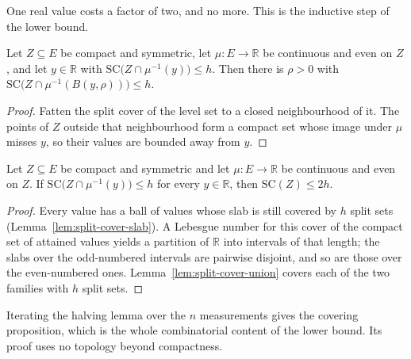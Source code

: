 One real value costs a factor of two, and no more. This is the inductive step of the
lower bound.

\begin{lemma}
\label{lem:split-cover-slab}
\leanok
{}
Let $Z \subseteq E$ be compact and symmetric, let $\mu : E \to \mathbb{R}$ be
continuous and even on $Z$, and let $y \in \mathbb{R}$ with
$\mathrm{SC}\bigl( Z \cap \mu^{-1}(y) \bigr) \le h$. Then there is $\rho > 0$ with
$\mathrm{SC}\bigl( Z \cap \mu^{-1}(B(y, \rho)) \bigr) \le h$.
\end{lemma}
\begin{proof}
\leanok
{}
Fatten the split cover of the level set to a closed neighbourhood of it. The points of
$Z$ outside that neighbourhood form a compact set whose image under $\mu$ misses $y$,
so their values are bounded away from $y$.
\end{proof}

\begin{theorem}
\label{thm:halving}
\leanok
{}
Let $Z \subseteq E$ be compact and symmetric and let $\mu : E \to \mathbb{R}$ be
continuous and even on $Z$. If $\mathrm{SC}\bigl( Z \cap \mu^{-1}(y) \bigr) \le h$ for
every $y \in \mathbb{R}$, then $\mathrm{SC}(Z) \le 2h$.
\end{theorem}
\begin{proof}
\leanok
{}
Every value has a ball of values whose slab is still covered by $h$ split sets
(Lemma~\ref{lem:split-cover-slab}). A Lebesgue number for this cover of the compact
set of attained values yields a partition of $\mathbb{R}$ into intervals of that
length; the slabs over the odd-numbered intervals are pairwise disjoint, and so are
those over the even-numbered ones. Lemma~\ref{lem:split-cover-union} covers each of
the two families with $h$ split sets.
\end{proof}

Iterating the halving lemma over the $n$ measurements gives the covering proposition,
which is the whole combinatorial content of the lower bound. Its proof uses no
topology beyond compactness.

